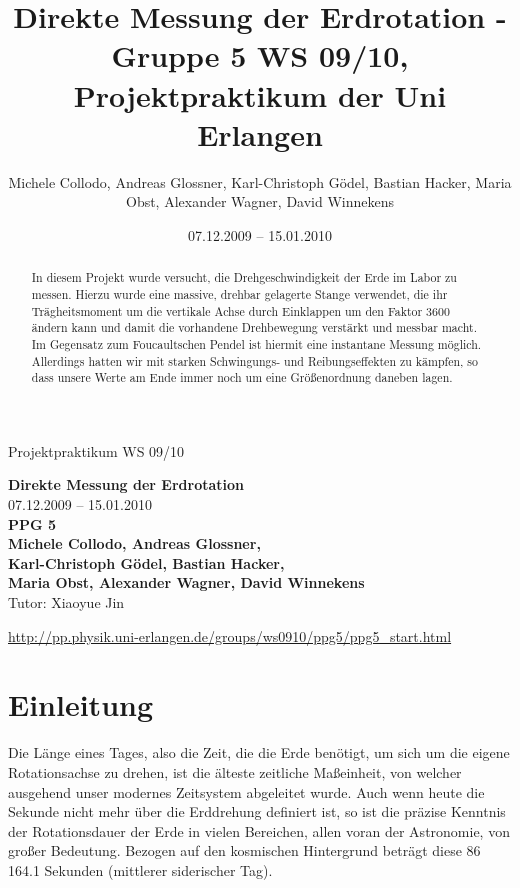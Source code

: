 \documentclass[11pt]{scrartcl}
\title{Direkte Messung der Erdrotation - Gruppe 5 WS 09/10, Projektpraktikum der Uni Erlangen}
\date{07.12.2009 -- 15.01.2010}
\author{Michele Collodo, Andreas Glossner, Karl-Christoph G\"odel, Bastian Hacker, Maria Obst, Alexander Wagner, David Winnekens}
\begin{document}
\sloppy %
\thispagestyle{empty}
\large{Projektpraktikum WS 09/10}
\hfill
{}
\\[8\baselineskip]
\begin{center}
{\fontsize{36}{54}\textbf{Direkte Messung der Erdrotation}}
\\[2\baselineskip]
{\Large 07.12.2009 -- 15.01.2010}
\\[7\baselineskip]
{\huge\textbf{PPG 5}}
\\[0.5\baselineskip]
{\large\textbf{
Michele Collodo,
Andreas Glossner,\\
Karl-Christoph G\"odel,
Bastian Hacker,\\
Maria Obst,
Alexander Wagner,
David Winnekens}\\
Tutor: Xiaoyue Jin}
\vfill



\small{\url{http://pp.physik.uni-erlangen.de/groups/ws0910/ppg5/ppg5\_start.html}}
\end{center}
\newpage



\tableofcontents
\vfill



\begin{abstract}
In diesem Projekt wurde versucht, die Drehgeschwindigkeit der Erde im Labor zu messen.
Hierzu wurde eine massive, drehbar gelagerte Stange verwendet, die ihr Trägheitsmoment um die vertikale Achse durch Einklappen um den Faktor 3600 ändern kann und damit die vorhandene Drehbewegung verstärkt und messbar macht.
Im Gegensatz zum Foucaultschen Pendel ist hiermit eine instantane Messung möglich.
Allerdings hatten wir mit starken Schwingungs- und Reibungseffekten zu kämpfen, so dass unsere Werte am Ende immer noch um eine Größenordnung daneben lagen.
\end{abstract}
\newpage

\section{Einleitung} %
Die Länge eines Tages, also die Zeit, die die Erde benötigt, um sich um die eigene Rotationsachse zu drehen, ist die älteste zeitliche Maßeinheit, von welcher ausgehend unser modernes Zeitsystem abgeleitet wurde. Auch wenn heute die Sekunde nicht mehr über die Erddrehung definiert ist, so ist die präzise Kenntnis der Rotationsdauer der Erde in vielen Bereichen, allen voran der Astronomie, von großer Bedeutung. Bezogen auf den kosmischen Hintergrund beträgt diese 86\,164.1 Sekunden (mittlerer siderischer Tag).
\end{document}
